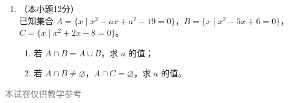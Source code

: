 \documentclass[12pt, a4paper]{ctexart}
\begin{document}
\begin{enumerate}[resume]
\vspace{7cm}

\item[22.]（本小题12分）\\
已知集合 $A=\{x\mid x^2-ax+a^2-19=0\}$，$B=\{x\mid x^2-5x+6=0\}$，$C=\{x\mid x^2+2x-8=0\}$。
\begin{enumerate}[(1)]
  \item 若 $A\cap B=A\cup B$，求 $a$ 的值；
  \item 若 $A\cap B\neq\varnothing$，$A\cap C=\varnothing$，求 $a$ 的值。
\end{enumerate}

\vspace{7cm}
\end{enumerate}

\vfill
\begin{center}
\small\textcolor{gray}{本试卷仅供教学参考}
\end{center}
\end{document}
